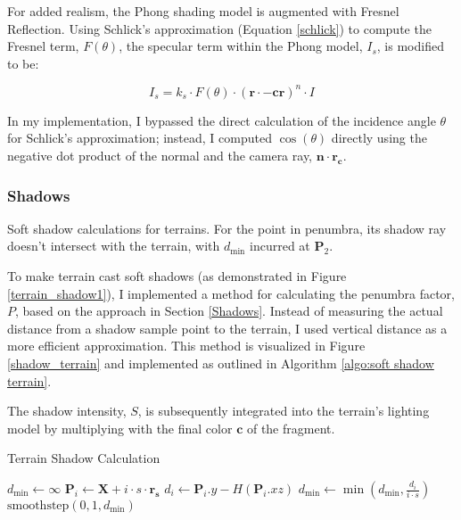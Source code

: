 For added realism, the Phong shading model is augmented with Fresnel Reflection. Using Schlick's approximation (Equation \ref{schlick}) to compute the Fresnel term, $F(\theta)$, the specular term within the Phong model, $I_s$, is modified to be:

\begin{equation}
I_{s} = k_s \cdot F(\theta) \cdot (\mathbf{r} \cdot \mathbf{-cr})^n \cdot I
\end{equation}

In my implementation, I bypassed the direct calculation of the incidence angle $\theta$ for Schlick's approximation; instead, I computed $\cos(\theta)$ directly using the negative dot product of the normal and the camera ray, $\mathbf{n} \cdot \mathbf{r_c}$.

\subsubsection{Shadows}
\label{Terrain Shadows}


{Soft shadow calculations for terrains. For the point in penumbra, its shadow ray doesn't intersect with the terrain, with $d_{\text{min}}$ incurred at $\mathbf{P}_2$.}{
To make terrain cast soft shadows (as demonstrated in Figure \ref{terrain_shadow1}), I implemented a method for calculating the penumbra factor, $P$, based on the approach in Section \ref{Shadows}. Instead of measuring the actual distance from a shadow sample point to the terrain, I used vertical distance as a more efficient approximation. This method is visualized in Figure \ref{shadow_terrain} and implemented as outlined in Algorithm \ref{algo:soft shadow terrain}.

\vspace{\baselineskip}

The shadow intensity, $S$, is subsequently integrated into the terrain's lighting model by multiplying with the final color $\mathbf{c}$ of the fragment.
}

\begin{algorithm}
\caption{Terrain Shadow Calculation}
\label{algo:soft shadow terrain}
\begin{algorithmic}
    \State $d_{\text{min}} \gets \infty$
        \State $\mathbf{P}_i \gets \mathbf{X} + i \cdot s \cdot \mathbf{r_s}$
        \State $d_i \gets \mathbf{P}_i.y - H(\mathbf{P}_i.xz)$
        \State $d_{\text{min}} \gets \min(d_{\text{min}}, \frac{d_i}{i \cdot s})$
    \EndFor
    \State \Return $\text{smoothstep}(0, 1, d_{\text{min}})$
\EndFunction
\end{algorithmic}
\end{algorithm}

